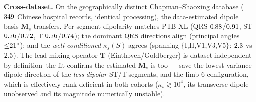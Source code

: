 \textbf{Cross-dataset.} On the geographically distinct Chapman--Shaoxing database
\cite{zheng2020chapman} ($349$ Chinese hospital records, identical processing), the
data-estimated dipole basis $\bm M_s$ transfers. Per-segment dipolarity matches PTB-XL
(QRS $0.88$/$0.91$, ST $0.76$/$0.72$, T
$0.76$/$0.74$); the dominant QRS directions align (principal angles
${\le}21^\circ$); and the \emph{well-conditioned} $\kappa_s(S)$ agrees (spanning
$\{$I,II,V1,V3,V5$\}$: $2.3$ vs $2.5$). The lead-mixing operator
$\bm T$ (Einthoven/Goldberger) is dataset-independent by definition; the fit confirms the
estimated $\bm M_s$ is too --- save the lowest-variance dipole direction of the
\emph{less-dipolar} ST/T segments, and the limb-6 configuration, which is effectively
rank-deficient in both cohorts ($\kappa_s{\gtrsim}10^{4}$, its transverse dipole
unobserved and its magnitude numerically unstable).
